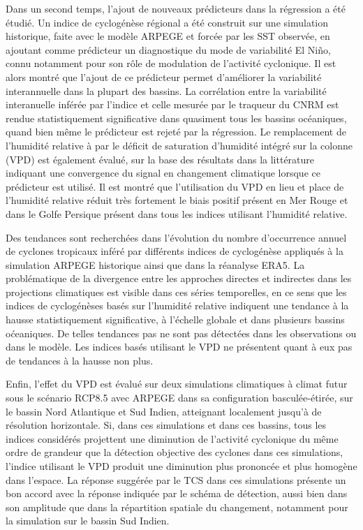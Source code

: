 \documentclass[../main.tex]{subfiles}
\begin{document}
Dans un second temps, l'ajout de nouveaux prédicteurs dans la régression a été étudié. Un indice de cyclogénèse régional a été construit sur une simulation
historique, faite avec le modèle ARPEGE et forcée par les SST observée, en ajoutant comme prédicteur un diagnostique du mode de variabilité El Niño, connu
notamment pour son rôle de modulation de l'activité cyclonique. Il est alors montré que l'ajout de ce prédicteur permet d'améliorer la variabilité interannuelle
dans la plupart des bassins. La corrélation entre la variabilité interanuelle inférée par l'indice et celle mesurée par le traqueur du CNRM est rendue
statistiquement significative dans quasiment tous les bassins océaniques, quand bien même le prédicteur est rejeté par la régression. Le remplacement de
l'humidité relative à  par le déficit de saturation d'humidité intégré sur la colonne (VPD) est également évalué, sur la base des résultats dans la
littérature indiquant une convergence du signal en changement climatique lorsque ce prédicteur est utilisé. Il est montré que l'utilisation du VPD en lieu et
place de l'humidité relative réduit très fortement le biais positif présent en Mer Rouge et dans le Golfe Persique présent dans tous les indices utilisant
l'humidité relative.

Des tendances sont recherchées dans l'évolution du nombre d'occurrence annuel de cyclones tropicaux inféré par différents indices de cyclogénèse appliqués à la
simulation ARPEGE historique ainsi que dans la réanalyse ERA5. La problématique de la divergence entre les approches directes et indirectes dans les projections
climatiques est visible dans ces séries temporelles, en ce sens que les indices de cyclogénèses basés sur l'humidité relative indiquent une tendance à la hausse
statistiquement significative, à l'échelle globale et dans plusieurs bassins oćeaniques. De telles tendances pas ne sont pas détectées dans les observations ou
dans le modèle. Les indices basés utilisant le VPD ne présentent quant à eux pas de tendances à la hausse non plus.

Enfin, l'effet du VPD est évalué sur deux simulations climatiques à climat futur sous le scénario RCP8.5 avec ARPEGE dans sa configuration basculée-étirée, sur
le bassin Nord Atlantique et Sud Indien, atteignant localement jusqu'à  de résolution horizontale. Si, dans ces simulations et dans ces bassins, tous les
indices considérés projettent une diminution de l'activité cyclonique du même ordre de grandeur que la détection objective des cyclones dans ces simulations,
l'indice utilisant le VPD produit une diminution plus prononcée et plus homogène dans l'espace. La réponse suggérée par le TCS dans ces simulations présente un
bon accord avec la réponse indiquée par le schéma de détection, aussi bien dans son amplitude que dans la répartition spatiale du changement, notamment pour la
simulation sur le bassin Sud Indien.
\end{document}
